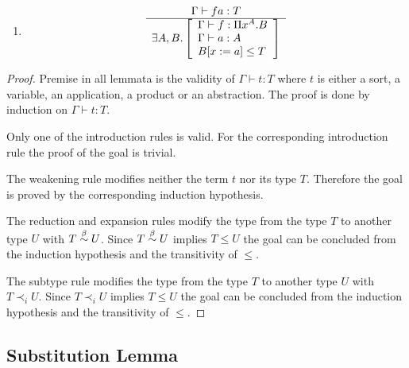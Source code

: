 \begin{theorem}
\begin{enumerate}
    \item %
        $$
        \begin{array}{c} 
            \Gamma \vdash f a : T
         \\ \hline 
            \exists
                A, B.
                \left[
                \begin{array}{l}
                    \Gamma \vdash f: \Pi x^A. B
                    \\
                    \Gamma \vdash a: A
                    \\
                    B[x:=a] \le T
                \end{array}
                \right]
        \end{array}
        $$
    \end{enumerate}

    \begin{proof}
        Premise in all lemmata is the validity of $\Gamma \vdash t: T$ where $t$
        is either a sort, a variable, an application, a product or an
        abstraction. The proof is done by induction on $\Gamma \vdash t: T$.

        Only one of the introduction rules is valid. For the corresponding
        introduction rule the proof of the goal is trivial.

        The weakening rule modifies neither the term $t$ nor its type $T$.
        Therefore the goal is proved by the corresponding induction hypothesis.

        The reduction and expansion rules modify the type from the type $T$ to
        another type $U$ with $T \stackrel{\beta}{\sim} U$. Since $T \stackrel{\beta}{\sim} U$ implies $T \le U$
        the goal can be concluded from the induction hypothesis and the
        transitivity of $\le$.

        The subtype rule modifies the type from the type $T$ to another type $U$
        with $T \prec_i U$. Since $T \prec_i U$ implies $T \le U$ the goal can be
        concluded from the induction hypothesis and the transitivity of $\le$.
    \end{proof}
\end{theorem}





\subsection{Substitution Lemma}



